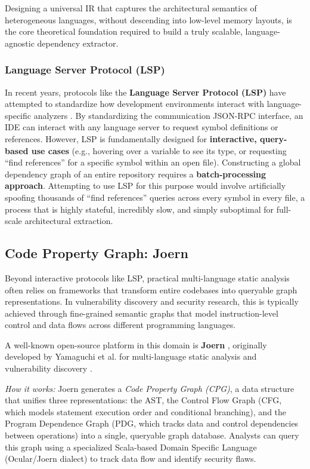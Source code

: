 Designing a universal IR that captures the architectural semantics of
heterogeneous languages, without descending into low-level memory
layouts, is the core theoretical foundation required to build a truly
scalable, language-agnostic dependency extractor.

\subsubsection{Language Server Protocol (LSP)}
\label{sec:ir_and_lsp}

In recent years, protocols like the \textbf{Language Server Protocol
(LSP)} have attempted to standardize how development environments
interact with language-specific analyzers \cite{microsoft_lsp_spec}.
By standardizing the communication JSON-RPC interface, an IDE can
interact with any language server to request symbol definitions or
references. However, LSP is fundamentally designed for
\textbf{interactive, query-based use cases} (e.g., hovering over a
  variable to see its type, or requesting ``find references'' for a
specific symbol within an open file). Constructing a global
dependency graph of an entire repository requires a
\textbf{batch-processing approach}. Attempting to use LSP for this
purpose would involve artificially spoofing thousands of ``find
references'' queries across every symbol in every file, a process that
is highly stateful, incredibly slow, and simply suboptimal for
full-scale architectural extraction.

\subsection{Code Property Graph: Joern}
\label{sec:code_property_graphs}

Beyond interactive protocols like LSP, practical multi-language static
analysis often relies on frameworks that transform entire codebases into
queryable graph representations. In vulnerability discovery and security
research, this is typically achieved through fine-grained semantic graphs that
model instruction-level control and data flows across different programming
languages.

A well-known open-source platform in this domain is \textbf{Joern}
\cite{joern_docs}, originally developed by Yamaguchi et al. for
multi-language static analysis and vulnerability discovery
\cite{yamaguchi_modeling_2014}.

\textit{How it works:} Joern generates a \textit{Code Property Graph
(CPG)}, a data structure that unifies three representations: the AST, the
Control Flow Graph (CFG, which models statement execution order and conditional
branching), and the Program Dependence Graph (PDG, which tracks data and
control dependencies between operations) into a single, queryable graph
database. Analysts can query this graph using a specialized Scala-based Domain
Specific Language (Ocular/Joern dialect) to track data flow and identify
security flaws.

